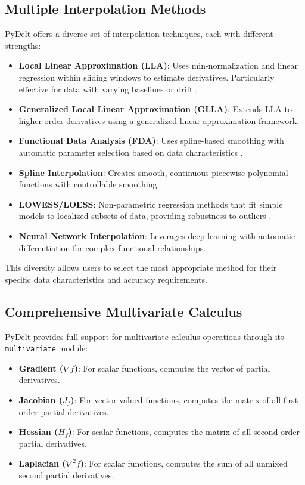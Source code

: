 \documentclass[11pt,a4paper]{article}
\begin{document}
\subsection{Multiple Interpolation Methods}

PyDelt offers a diverse set of interpolation techniques, each with different strengths:

\begin{itemize}
    \item \textbf{Local Linear Approximation (LLA)}: Uses min-normalization and linear regression within sliding windows to estimate derivatives. Particularly effective for data with varying baselines or drift \citep{lla2016}.
    
    \item \textbf{Generalized Local Linear Approximation (GLLA)}: Extends LLA to higher-order derivatives using a generalized linear approximation framework.
    
    \item \textbf{Functional Data Analysis (FDA)}: Uses spline-based smoothing with automatic parameter selection based on data characteristics \citep{fda2010}.
    
    \item \textbf{Spline Interpolation}: Creates smooth, continuous piecewise polynomial functions with controllable smoothing.
    
    \item \textbf{LOWESS/LOESS}: Non-parametric regression methods that fit simple models to localized subsets of data, providing robustness to outliers \citep{cleveland1979robust}.
    
    \item \textbf{Neural Network Interpolation}: Leverages deep learning with automatic differentiation for complex functional relationships.
\end{itemize}

This diversity allows users to select the most appropriate method for their specific data characteristics and accuracy requirements.

\subsection{Comprehensive Multivariate Calculus}

PyDelt provides full support for multivariate calculus operations through its \texttt{multivariate} module:

\begin{itemize}
    \item \textbf{Gradient ($\nabla f$)}: For scalar functions, computes the vector of partial derivatives.
    \item \textbf{Jacobian ($J_f$)}: For vector-valued functions, computes the matrix of all first-order partial derivatives.
    \item \textbf{Hessian ($H_f$)}: For scalar functions, computes the matrix of all second-order partial derivatives.
    \item \textbf{Laplacian ($\nabla^2 f$)}: For scalar functions, computes the sum of all unmixed second partial derivatives.
\end{itemize}
\end{document}
